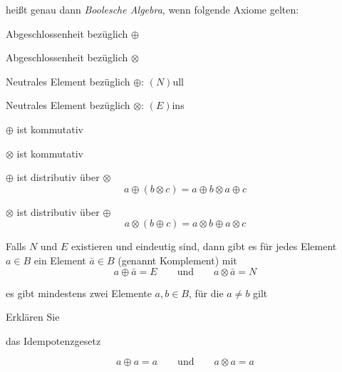 \documentclass
[
  draft    = true,
  fontsize = 11pt,
  parskip  = half-,
  BCOR     = 0pt,
  DIV      = 11,
  ngerman,
  dvipsnames
]
{scrartcl}
\begin{document}
\begin{mytemize}
\begin{achim}
          heißt genau dann \emph{Boolesche Algebra}, wenn folgende Axiome gelten:
          \begin{mytemize}
            \item Abgeschlossenheit bezüglich $\oplus$
            \item Abgeschlossenheit bezüglich $\otimes$
            \item Neutrales Element bezüglich $\oplus$: $(N)$ull
            \item Neutrales Element bezüglich $\otimes$: $(E)$ins
            \item $\oplus$ ist kommutativ
            \item $\otimes$ ist kommutativ
            \item $\oplus$ ist distributiv über $\otimes$
                  \begin{equation*}
                    a\oplus(b\otimes c)=a\oplus b\otimes a\oplus c
                  \end{equation*}
            \item $\otimes$ ist distributiv über $\oplus$
                  \begin{equation*}
                    a\otimes(b\oplus c)=a\otimes b\oplus a\otimes c
                  \end{equation*}
            \item Falls $N$ und $E$ existieren und eindeutig sind,
                  dann gibt es für jedes Element $a\in B$ ein Element $\bar{a}\in B$
                  (genannt Komplement) mit
                  \begin{equation*}
                    a\oplus\bar{a}=E
                    \qquad\text{und}\qquad
                    a\otimes\bar{a}=N
                  \end{equation*}
            \item es gibt mindestens zwei Elemente $a,b\in B$, für die $a\neq b$ gilt
          \end{mytemize}
        \end{achim}
  \item Erklären Sie
        \begin{mytemize}
          \item das Idempotenzgesetz
            \begin{evelyn}
                \begin{equation*}
                    a\oplus a=a
                    \qquad\text{und}\qquad
                    a\otimes a=a
                \end{equation*}

\end{evelyn}
\end{mytemize}
\end{mytemize}
\end{document}
